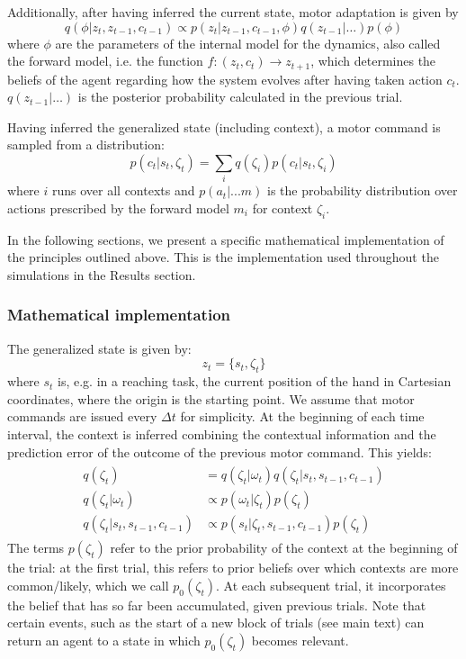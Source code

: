 \documentclass[a4paper,doc,floatsintext,natbib]{apa6}%
\begin{document}
Additionally, after having inferred the current state, motor adaptation is given by
\begin{equation}
q(\phi | z_t, z_{t-1}, c_{t-1}) \propto p(z_t | z_{t-1}, c_{t-1}, \phi)q(z_{t-1}|\ldots)p(\phi) \label{eqn:motor-adaptation}
\end{equation}
where $\phi$ are the parameters of the internal model for the dynamics, also called the forward model,
i.e. the function $f: (z_t, c_t) \rightarrow z_{t+1}$, which determines the beliefs of
the agent regarding how the system evolves after having taken action $c_t$. $q(z_{t-1}|\ldots)$ is the
posterior probability calculated in the previous trial.

Having inferred the generalized state (including context), a motor command is
sampled from a distribution:
\begin{equation}
p(c_t | s_t, \zeta_t) = \displaystyle\sum_{i}q(\zeta_i)p(c_t | s_t, \zeta_i)
\end{equation}
where $i$ runs over all contexts and $p(a_t | ... m)$ is the probability distribution over actions
prescribed by the forward model $m_i$ for context $\zeta_i$.

In the following sections, we present a specific mathematical implementation
of the principles outlined above. This is the implementation used throughout the
simulations in the Results section.

\subsubsection{Mathematical implementation}
The generalized state is given by:
\begin{equation}
z_t = \{s_t, \zeta_t\}
\end{equation}
where $s_t$ is, e.g. in a reaching task, the current position of the hand in
Cartesian coordinates, where the origin is the starting point. We assume that
motor commands are issued every $\Delta t$ for simplicity. At the beginning of
each time interval, the context is inferred combining the contextual
information and the prediction error of the outcome of the previous motor
command. This yields:
\begin{align}
  \begin{split}
  q(\zeta_t) &= q(\zeta_t | \omega_t)q(\zeta_t | s_t, s_{t-1}, c_{t-1}) \\ \label{eqn:estimated-context}
  q(\zeta_t | \omega_t) &\propto p(\omega_t | \zeta_t)p(\zeta_t) \\
  q(\zeta_t | s_t, s_{t-1}, c_{t-1}) &\propto p(s_t | \zeta_t, s_{t-1}, c_{t-1})p(\zeta_t)
  \end{split}
\end{align}
The terms $p(\zeta_t)$ refer to the prior probability of the context at the
beginning of the trial: at the first trial, this refers to prior beliefs over
which contexts are more common/likely, which we call $p_0(\zeta_t)$. At each
subsequent trial, it incorporates the belief that has so far been accumulated,
given previous trials. Note that certain events, such as the start of a new
block of trials (see main text) can return an agent to a state in which
$p_0(\zeta_t)$ becomes relevant.
\end{document}
